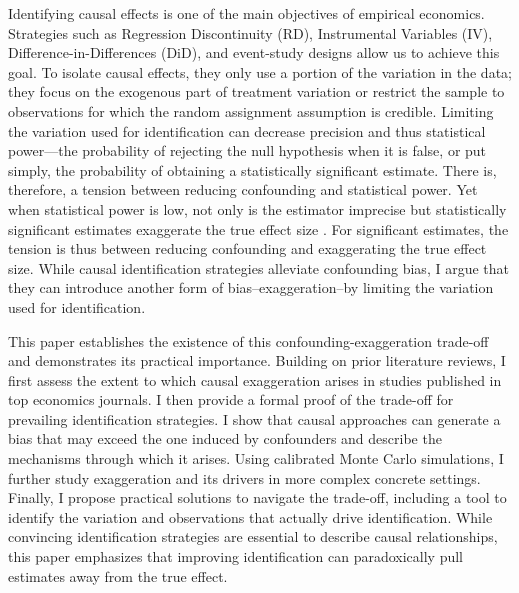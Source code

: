 			Identifying causal effects is one of the main objectives of empirical economics. Strategies such as Regression Discontinuity (RD), Instrumental Variables (IV), Difference-in-Differences (DiD), and event-study designs allow us to achieve this goal. To isolate causal effects, they only use a portion of the variation in the data; they focus on the exogenous part of treatment variation or restrict the sample to observations for which the random assignment assumption is credible. Limiting the variation used for identification can decrease precision and thus statistical power---the probability of rejecting the null hypothesis when it is false, or put simply, the probability of obtaining a statistically significant estimate. There is, therefore, a tension between reducing confounding and statistical power. Yet when statistical power is low, not only is the estimator imprecise but statistically significant estimates exaggerate the true effect size \citep{gelmanType2000, ioannidis_why_2008, gelman_beyond_2014}. For significant estimates, the tension is thus between reducing confounding and exaggerating the true effect size. While causal identification strategies alleviate confounding bias, I argue that they can introduce another form of bias--exaggeration--by limiting the variation used for identification. 
			
			This paper establishes the existence of this confounding-exaggeration trade-off and demonstrates its practical importance. Building on prior literature reviews, I first assess the extent to which causal exaggeration arises in studies published in top economics journals. I then provide a formal proof of the trade-off for prevailing identification strategies. I show that causal approaches can generate a bias that may exceed the one induced by confounders and describe the mechanisms through which it arises. Using calibrated Monte Carlo simulations, I further study exaggeration and its drivers in more complex concrete settings. Finally, I propose practical solutions to navigate the trade-off, including a tool to identify the variation and observations that actually drive identification. While convincing identification strategies are essential to describe causal relationships, this paper emphasizes that improving identification can paradoxically pull estimates away from the true effect.%
			
